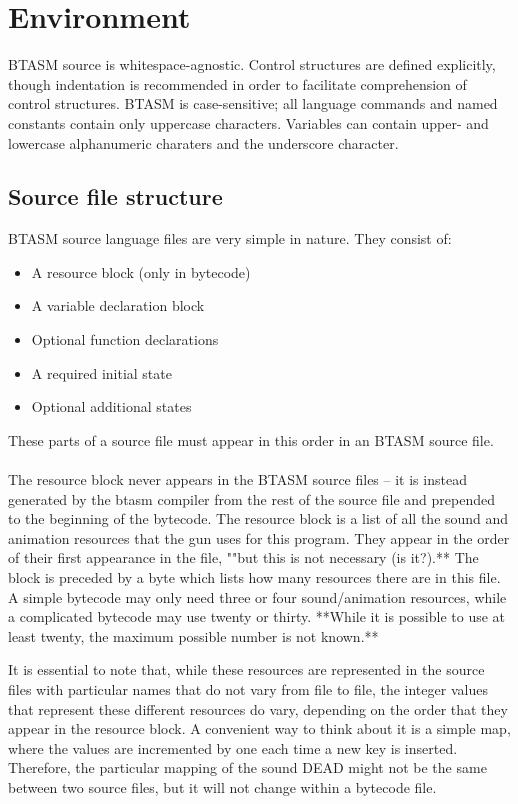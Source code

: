 \documentclass[12pt,a4paper]{scrbook}
\begin{document}
\section{Environment}

BTASM source is whitespace-agnostic.  Control structures are defined explicitly, though indentation 
is
recommended in order to facilitate comprehension of control structures.  BTASM is case-sensitive;
all language commands and named constants contain only uppercase characters.  
Variables can contain upper- and lowercase alphanumeric charaters and the underscore character.

\subsection{Source file structure}
BTASM source language files are very simple in nature.  They consist of:
\begin{itemize}
\item A resource block (only in bytecode)
\item A variable declaration block
\item Optional function declarations
\item A required initial state
\item Optional additional states
\end{itemize}

These parts of a source file must appear in this order in an BTASM source file.  
\\\\
The resource block never appears in the BTASM source files -- it is instead generated by the btasm
compiler from
the rest of the source file and prepended to the beginning of the bytecode.  The resource block is 
a list of all the sound and animation resources that the gun uses for this program.  They appear in
the order of their first appearance in the file, ""but this is not necessary  (is it?).**  
The block is preceded by a byte which lists how many resources there are in this file.  A simple
bytecode may only need three or four sound/animation resources, while a complicated bytecode may use
twenty or thirty.  **While it is possible to use at least twenty, the maximum possible number is 
not known.**  

It is essential to note that, while these resources are represented in the source files with 
particular names that do not vary from file to file, the integer values that represent these 
different resources do vary, depending on the order that they appear in the resource block.  A 
convenient way to think about it is a simple map, where the values are incremented by one each time
a new key is inserted.  Therefore, the particular mapping of the sound DEAD might not be the same 
between two source files, but it will not change within a bytecode file.
\end{document}

